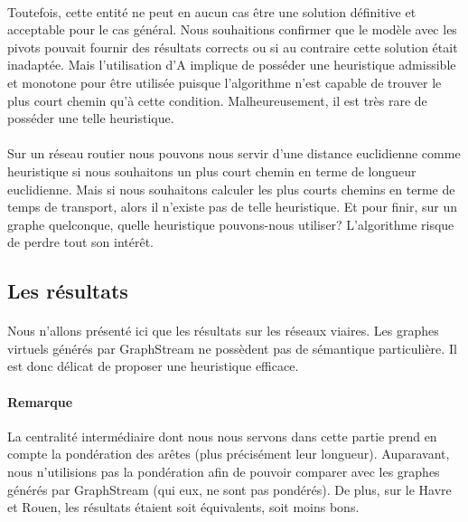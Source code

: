 \documentclass[a4paper, 10pt]{report}
\begin{document}
\paragraph{}Toutefois, cette entité ne peut en aucun cas être une solution définitive et acceptable pour le cas général. Nous souhaitions confirmer que le modèle avec les pivots pouvait fournir des résultats corrects ou si au contraire cette solution était inadaptée. Mais l'utilisation d'A\up{*} implique de posséder une heuristique admissible et monotone pour être utilisée puisque l'algorithme n'est capable de trouver le plus court chemin qu'à cette condition. Malheureusement, il est très rare de posséder une telle heuristique. 

\paragraph{}Sur un réseau routier nous pouvons nous servir d'une distance euclidienne comme heuristique si nous souhaitons un plus court chemin en terme de longueur euclidienne. Mais si nous souhaitons calculer les plus courts chemins en terme de temps de transport, alors il n'existe pas de telle heuristique. Et pour finir, sur un graphe quelconque, quelle heuristique pouvons-nous utiliser? L'algorithme risque de perdre tout son intérêt.


		\subsection{Les résultats}

%
%

\paragraph{}Nous n'allons présenté ici que les résultats sur les réseaux viaires. Les graphes virtuels générés par GraphStream ne possèdent pas de sémantique particulière. Il est donc délicat de proposer une heuristique efficace. 

\paragraph{Remarque}La centralité intermédiaire dont nous nous servons dans cette partie prend en compte la pondération des arêtes (plus précisément leur longueur). Auparavant, nous n'utilisions pas la pondération afin de pouvoir comparer avec les graphes générés par GraphStream (qui eux, ne sont pas pondérés). De plus, sur le Havre et Rouen, les résultats étaient soit équivalents, soit moins bons.
\end{document}
